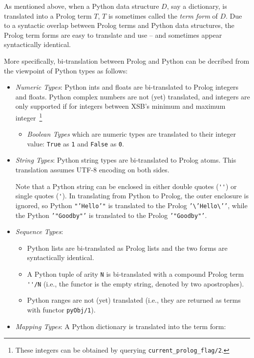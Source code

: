 As mentioned above, when a Python data structure $D$, say a
dictionary, is translated into a Prolog term $T$, $T$ is sometimes
called the {\em term form} of $D$.  Due to a syntactic overlap between
Prolog terms and Python data structures, the Prolog term forms are
easy to translate and use -- and sometimes appear syntactically
identical.

More specifically, bi-translation between Prolog and Python can be
decribed from the viewpoint of Python types as follows: 

\begin{itemize}
       \item {\em Numeric Types}: Python ints and floats are
         bi-translated to Prolog integers and floats.  Python complex
         numbers are not (yet) translated, and integers are only
         supported if for integers between XSB's minimum and maximum
         integer~\footnote{These integers can be obtained by querying
           {\tt current\_prolog\_flag/2}.}
         \begin{itemize}
           \item {\em Boolean Types} which are numeric types are
             translated to their integer value: {\tt True} as {\tt 1}
             and {\tt False} as {\tt 0}.
         \end{itemize}
       \item {\em String Types}: Python string types are bi-translated
         to Prolog atoms.  This translation assumes UTF-8 encoding on
         both sides.

         Note that a Python string can be enclosed in either double
         quotes (\verb|''|) or single quotes (\verb|'|).  In
         translating from Python to Prolog, the outer enclosure is
         ignored, so Python {\tt "'Hello'"} is translated to the
         Prolog {\tt '\textbackslash{}'Hello\textbackslash{}'{}'},
         while the Python {\tt '"Goodby"'} is translated to the Prolog
         {\tt '"Goodby"'}.
       \item {\em Sequence Types}:
         \begin{itemize}
           \item Python lists are bi-translated as Prolog lists and
             the two forms are syntactically identical.
           \item A Python tuple of arity {\tt N} is bi-translated with
             a compound Prolog term \verb|''/N| (i.e., the functor is
             the empty string, denoted by two apostrophes).
             \item Python ranges are not (yet) translated (i.e., they
               are returned as terms with functor {\tt pyObj/1}).
         \end{itemize}
       \item {\em Mapping Types}: A Python dictionary is translated
         into the term form:


\end{itemize}
